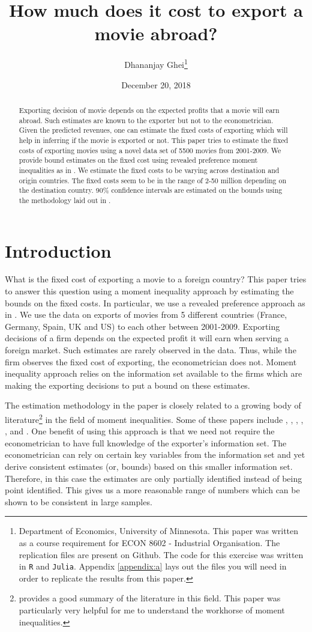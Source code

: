 \documentclass[11pt, letterpaper]{article} \usepackage{amsmath}
\title{How much does it cost to export a movie abroad?}
\author{Dhananjay Ghei\footnote{Department of Economics, University of
    Minnesota. This paper was written as a course requirement for ECON
    8602 - Industrial Organisation. The replication files are present
    on Github. The code for this exercise was written in \texttt{R}
    and \texttt{Julia}. Appendix \ref{appendix:a} lays out the files
    you will need in order to replicate the results from this paper.}}
\date{December 20, 2018}
\begin{document}
\maketitle
\begin{abstract}
  Exporting decision of movie depends on the expected profits that a
  movie will earn abroad. Such estimates are known to the exporter but
  not to the econometrician. Given the predicted revenues, one can
  estimate the fixed costs of exporting which will help in inferring
  if the movie is exported or not. This paper tries to estimate the
  fixed costs of exporting movies using a novel data set of 5500
  movies from 2001-2009. We provide bound estimates on the fixed cost
  using revealed preference moment inequalities as in
  \citet{pakes2015}. We estimate the fixed costs to be varying across
  destination and origin countries. The fixed costs seem to be in the
  range of 2-50 million depending on the destination country. 90\%
  confidence intervals are estimated on the bounds using the
  methodology laid out in \citet{pakes2015}.
\end{abstract}
\newpage
\tableofcontents
\newpage
\section{Introduction}
What is the fixed cost of exporting a movie to a foreign country? This
paper tries to answer this question using a moment inequality approach
by estimating the bounds on the fixed costs. In particular, we use a
revealed preference approach as in \citep{pakes2015}. We use the data
on exports of movies from 5 different countries (France, Germany,
Spain, UK and US) to each other between 2001-2009.  Exporting
decisions of a firm depends on the expected profit it will earn when
serving a foreign market. Such estimates are rarely observed in the
data. Thus, while the firm observes the fixed cost of exporting, the
econometrician does not. Moment inequality approach relies on the
information set available to the firms which are making the exporting
decisions to put a bound on these estimates.

The estimation methodology in the paper is closely related to a
growing body of literature\footnote{\citep{tamer2010} provides a good
  summary of the literature in this field. This paper was particularly
  very helpful for me to understand the workhorse of moment
  inequalities.} in the field of moment inequalities. Some of these
papers include \citet{chernozhukov2013}, \citet{manski2004},
\citet{pakes2010}, \citet{andrews2010}, \citet{holmes2011},
\citet{ho2009} and \citet{sweeting2013}. One benefit of using this
approach is that we need not require the econometrician to have full
knowledge of the exporter's information set. The econometrician can
rely on certain key variables from the information set and yet derive
consistent estimates (or, bounds) based on this smaller information
set. Therefore, in this case the estimates are only partially
identified instead of being point identified. This gives us a more
reasonable range of numbers which can be shown to be consistent in
large samples.
\end{document}
